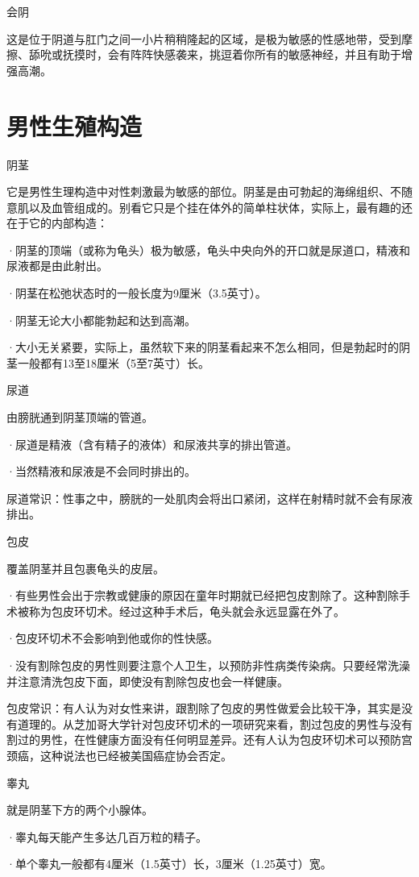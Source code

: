 \documentclass[12pt,UTF8,openany]{ctexbook}
\begin{document}
会阴

这是位于阴道与肛门之间一小片稍稍隆起的区域，是极为敏感的性感地带，受到摩擦、舔吮或抚摸时，会有阵阵快感袭来，挑逗着你所有的敏感神经，并且有助于增强高潮。

\section{男性生殖构造}

阴茎

它是男性生理构造中对性刺激最为敏感的部位。阴茎是由可勃起的海绵组织、不随意肌以及血管组成的。别看它只是个挂在体外的简单柱状体，实际上，最有趣的还在于它的内部构造：

·阴茎的顶端（或称为龟头）极为敏感，龟头中央向外的开口就是尿道口，精液和尿液都是由此射出。

·阴茎在松弛状态时的一般长度为9厘米（3.5英寸）。

·阴茎无论大小都能勃起和达到高潮。

·大小无关紧要，实际上，虽然软下来的阴茎看起来不怎么相同，但是勃起时的阴茎一般都有13至18厘米（5至7英寸）长。

尿道

由膀胱通到阴茎顶端的管道。

·尿道是精液（含有精子的液体）和尿液共享的排出管道。

·当然精液和尿液是不会同时排出的。

尿道常识：性事之中，膀胱的一处肌肉会将出口紧闭，这样在射精时就不会有尿液排出。

包皮

覆盖阴茎并且包裹龟头的皮层。

·有些男性会出于宗教或健康的原因在童年时期就已经把包皮割除了。这种割除手术被称为包皮环切术。经过这种手术后，龟头就会永远显露在外了。

·包皮环切术不会影响到他或你的性快感。

·没有割除包皮的男性则要注意个人卫生，以预防非性病类传染病。只要经常洗澡并注意清洗包皮下面，即使没有割除包皮也会一样健康。

包皮常识：有人认为对女性来讲，跟割除了包皮的男性做爱会比较干净，其实是没有道理的。从芝加哥大学针对包皮环切术的一项研究来看，割过包皮的男性与没有割过的男性，在性健康方面没有任何明显差异。还有人认为包皮环切术可以预防宫颈癌，这种说法也已经被美国癌症协会否定。

睾丸

就是阴茎下方的两个小腺体。

·睾丸每天能产生多达几百万粒的精子。

·单个睾丸一般都有4厘米（1.5英寸）长，3厘米（1.25英寸）宽。
\end{document}

